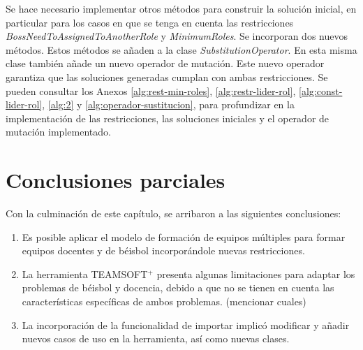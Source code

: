 Se hace necesario implementar otros métodos para construir la solución inicial, en particular para los casos en que se tenga en cuenta las restricciones \textit{BossNeedToAssignedToAnotherRole} y \textit{MinimumRoles}. Se incorporan dos nuevos métodos. Estos métodos se añaden a la clase \textit{SubstitutionOperator}. En esta misma clase también añade un nuevo operador de mutación. Este nuevo operador garantiza que las soluciones generadas cumplan con ambas restricciones. Se pueden consultar los Anexos \ref{alg:rest-min-roles}, \ref{alg:restr-lider-rol}, \ref{alg:const-lider-rol}, \ref{alg:2} y \ref{alg:operador-sustitucion}, para profundizar en la implementación de las restricciones, las soluciones iniciales y el operador de mutación implementado.

\section{Conclusiones parciales}

Con la culminación de este capítulo, se arribaron a las siguientes conclusiones:
\begin{enumerate}
	\item Es posible aplicar el modelo de formación de equipos múltiples para formar equipos docentes y de béisbol incorporándole nuevas restricciones.
	\item La herramienta TEAMSOFT$^+$ presenta algunas limitaciones para adaptar los problemas de béisbol y docencia, debido a que no se tienen en cuenta las características específicas de ambos problemas. (mencionar cuales)
	\item La incorporación de la funcionalidad de importar implicó modificar y añadir nuevos casos de uso en la herramienta, así como nuevas clases.
\end{enumerate}
